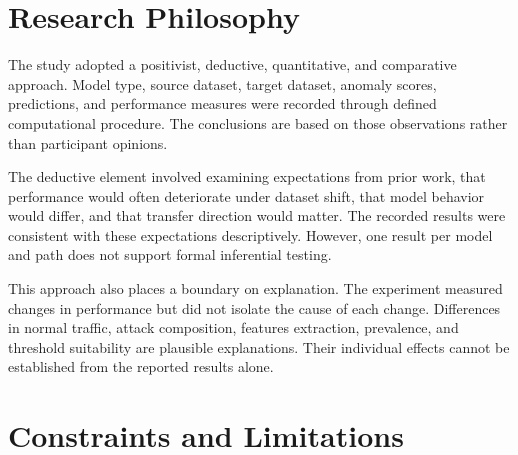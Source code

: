 \section{Research Philosophy}
\label{sec:conclusion-philosophy}

The study adopted a positivist, deductive, quantitative, and comparative approach. Model type, source dataset, target dataset, anomaly scores, 
predictions, and performance measures were recorded through defined computational procedure. The conclusions are based on those observations 
rather than participant opinions.

The deductive element involved examining expectations from prior work, that performance would often deteriorate under dataset shift, that model 
behavior would differ, and that transfer direction would matter. The recorded results were consistent with these expectations descriptively. 
However, one result per model and path does not support formal inferential testing.

This approach also places a boundary on explanation. The experiment measured changes in performance but did not isolate the cause of each change. 
Differences in normal traffic, attack composition, features extraction, prevalence, and threshold suitability are plausible explanations. Their 
individual effects cannot be established from the reported results alone.

\section{Constraints and Limitations}
\label{sec:conclusion-limitations}


